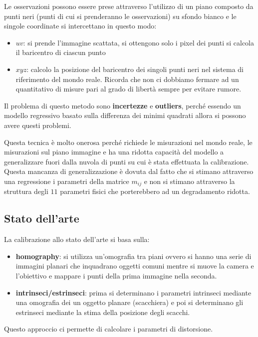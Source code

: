 Le osservazioni possono essere prese attraverso l'utilizzo di un piano composto 
da punti neri (punti di cui si prenderanno le osservazioni) su sfondo bianco e le singole coordinate si intercettano in questo modo:
\begin{itemize}
    \item $uv$: si prende l'immagine scattata, si ottengono solo i pixel dei punti 
    si calcola il baricentro di ciascun punto
    \item $xyz$: calcolo la posizione del baricentro dei singoli punti neri nel 
    sistema di riferimento del mondo reale. Ricorda che non ci dobbiamo fermare 
    ad un quantitativo di misure pari al grado di libertà sempre per evitare rumore.
\end{itemize}

Il problema di questo metodo sono \textbf{incertezze} e \textbf{outliers}, perché
essendo un modello regressivo basato sulla differenza dei minimi quadrati allora 
si possono avere questi problemi. 

Questa tecnica è molto onerosa perché richiede le misurazioni nel mondo reale, 
le misurazioni sul piano immagine e ha una ridotta capacità del modello a generalizzare 
fuori dalla nuvola di punti su cui è stata effettuata la calibrazione. Questa 
mancanza di generalizzazione è dovuta dal fatto che si stimano attraverso una regressione 
i parametri della matrice $m_{ij}$ e non si stimano attraverso la struttura degli 
$11$ parametri fisici che porterebbero ad un degradamento ridotta.


\subsection{Stato dell'arte}
La calibrazione allo stato dell'arte si basa sulla:
\begin{itemize}
    \item \textbf{homography}: si utilizza un'omografia tra piani ovvero si hanno 
    una serie di immagini planari che inquadrano oggetti comuni mentre si muove 
    la camera e l'obiettivo e mappare i punti della prima immagine nella seconda.
    \item \textbf{intrinseci/estrinseci}: prima si determinano i parametri intrinseci
    mediante una omografia dei un oggetto planare (scacchiera) e poi si determinano 
    gli estrinseci mediante la stima della posizione degli scacchi.
\end{itemize} 

Questo approccio ci permette di calcolare i parametri di distorsione.